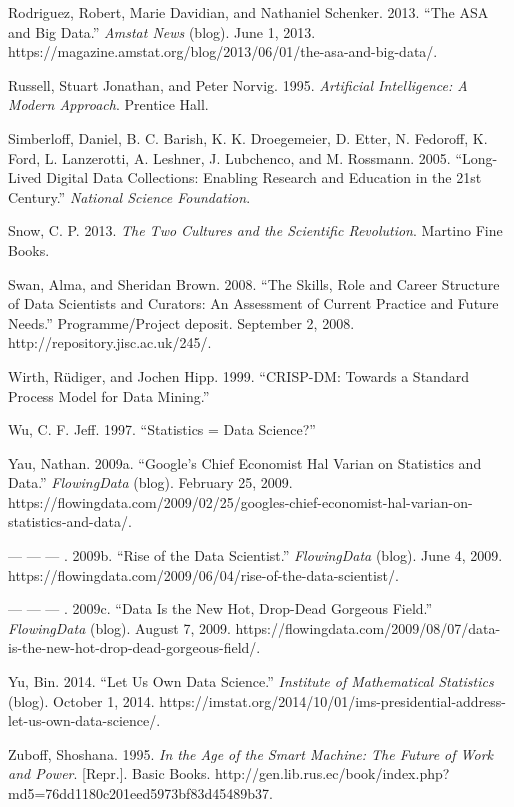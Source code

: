 \documentclass[
  letterpaper,
  DIV=11,
  numbers=noendperiod]{scrreprt}
\begin{document}
Rodriguez, Robert, Marie Davidian, and Nathaniel Schenker. 2013. ``The
ASA and Big Data.'' \emph{Amstat News} (blog). June 1, 2013.
https://magazine.amstat.org/blog/2013/06/01/the-asa-and-big-data/.

Russell, Stuart Jonathan, and Peter Norvig. 1995. \emph{Artificial
Intelligence: A Modern Approach}. Prentice Hall.

Simberloff, Daniel, B. C. Barish, K. K. Droegemeier, D. Etter, N.
Fedoroff, K. Ford, L. Lanzerotti, A. Leshner, J. Lubchenco, and M.
Rossmann. 2005. ``Long-Lived Digital Data Collections: Enabling Research
and Education in the 21st Century.'' \emph{National Science Foundation}.

Snow, C. P. 2013. \emph{The Two Cultures and the Scientific Revolution}.
Martino Fine Books.

Swan, Alma, and Sheridan Brown. 2008. ``The Skills, Role and Career
Structure of Data Scientists and Curators: An Assessment of Current
Practice and Future Needs.'' Programme/Project deposit. September 2,
2008. http://repository.jisc.ac.uk/245/.

Wirth, Rüdiger, and Jochen Hipp. 1999. ``CRISP-DM: Towards a Standard
Process Model for Data Mining.''

Wu, C. F. Jeff. 1997. ``Statistics = Data Science?''

Yau, Nathan. 2009a. ``Google's Chief Economist Hal Varian on Statistics
and Data.'' \emph{FlowingData} (blog). February 25, 2009.
https://flowingdata.com/2009/02/25/googles-chief-economist-hal-varian-on-statistics-and-data/.

--- --- --- . 2009b. ``Rise of the Data Scientist.'' \emph{FlowingData}
(blog). June 4, 2009.
https://flowingdata.com/2009/06/04/rise-of-the-data-scientist/.

--- --- --- . 2009c. ``Data Is the New Hot, Drop-Dead Gorgeous Field.''
\emph{FlowingData} (blog). August 7, 2009.
https://flowingdata.com/2009/08/07/data-is-the-new-hot-drop-dead-gorgeous-field/.

Yu, Bin. 2014. ``Let Us Own Data Science.'' \emph{Institute of
Mathematical Statistics} (blog). October 1, 2014.
https://imstat.org/2014/10/01/ims-presidential-address-let-us-own-data-science/.

Zuboff, Shoshana. 1995. \emph{In the Age of the Smart Machine: The
Future of Work and Power}. {[}Repr.{]}. Basic Books.
http://gen.lib.rus.ec/book/index.php?md5=76dd1180c201eed5973bf83d45489b37.
\end{document}
